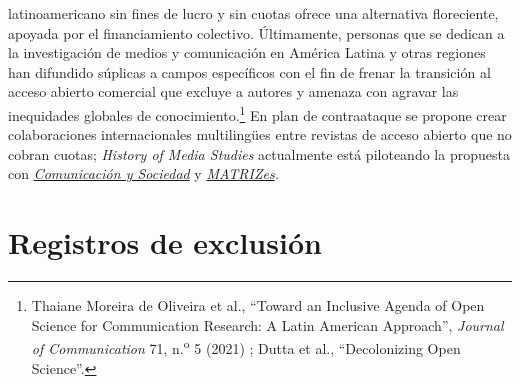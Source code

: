 \documentclass{tufte-handout}
\begin{document}
latinoamericano sin fines de lucro y sin cuotas ofrece una alternativa
floreciente, apoyada por el financiamiento colectivo. Últimamente,
personas que se dedican a la investigación de medios y comunicación en
América Latina y otras regiones han difundido súplicas a campos
específicos con el fin de frenar la transición al acceso abierto
comercial que excluye a autores y amenaza con agravar las inequidades
globales de conocimiento.\footnote{Thaiane Moreira de Oliveira et al.,
  ``Toward an Inclusive Agenda of Open Science for Communication
  Research: A Latin American Approach'', \emph{Journal of Communication}
  71, n.\textsuperscript{o} 5 (2021) ; Dutta et al., ``Decolonizing Open
  Science''.} En plan de contraataque se propone crear colaboraciones
internacionales multilingües entre revistas de acceso abierto que no
cobran cuotas; \emph{History of Media Studies} actualmente está
piloteando la propuesta con
\href{http://www.comunicacionysociedad.cucsh.udg.mx/index.php/comsoc}{\emph{Comunicación
y Sociedad}} y
\href{https://www.revistas.usp.br/matrizes/}{\emph{MATRIZes}}\emph{.}

\hypertarget{registros-de-exclusiuxf3n}{%
\section{Registros de exclusión}\label{registros-de-exclusiuxf3n}}
\end{document}
